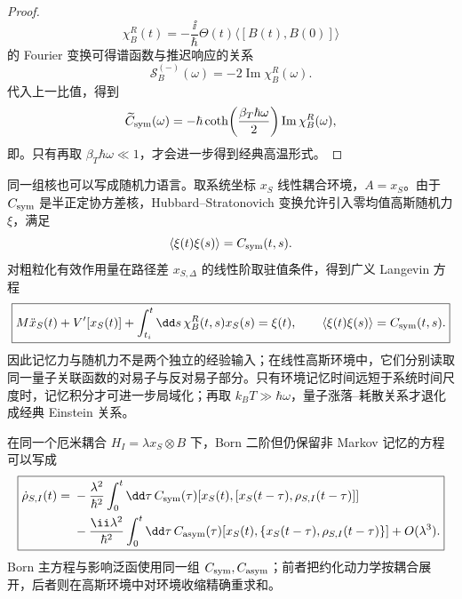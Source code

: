 \begin{proof}
\begin{equation*}
\chi_B^R(t)=-\frac{\ii}{\hbar}\Theta(t)\langle[B(t),B(0)]\rangle
\end{equation*}
的 Fourier 变换可得谱函数与推迟响应的关系
\begin{equation*}
\mathscr S_B^{(-)}(\omega)=-2\operatorname{Im}\chi_B^R(\omega).
\end{equation*}
代入上一比值，得到
\begin{equation*}
\widetilde C_{\rm sym}(\omega)
=-\hbar\coth\!\left(\frac{\beta_T\hbar\omega}{2}\right)
\operatorname{Im}\chi_B^R(\omega),
\end{equation*}
即。只有再取 $\beta_T\hbar\omega\ll1$，才会进一步得到经典高温形式。
\end{proof}


同一组核也可以写成随机力语言。取系统坐标 $x_S$ 线性耦合环境，$A=x_S$。由于 $C_{\rm sym}$ 是半正定协方差核，Hubbard--Stratonovich 变换允许引入零均值高斯随机力 $\xi$，满足
\[
\langle\xi(t)\xi(s)\rangle=C_{\rm sym}(t,s).
\]
对粗粒化有效作用量在路径差 $x_{S,\Delta}$ 的线性阶取驻值条件，得到广义 Langevin 方程
\begin{equation}
\boxed{
M\ddot x_S(t)+V'[x_S(t)]
+\int_{t_i}^{t}\dd s\,\chi_B^R(t,s)x_S(s)
=\xi(t),
\qquad
\langle\xi(t)\xi(s)\rangle=C_{\rm sym}(t,s).}
\label{eq:generalized_langevin_from_influence}
\end{equation}
因此记忆力与随机力不是两个独立的经验输入；在线性高斯环境中，它们分别读取同一量子关联函数的对易子与反对易子部分。只有环境记忆时间远短于系统时间尺度时，记忆积分才可进一步局域化；再取 $k_BT\gg\hbar\omega$，量子涨落--耗散关系才退化成经典 Einstein 关系。

在同一个厄米耦合 $H_I=\lambda x_S\otimes B$ 下，Born 二阶但仍保留非 Markov 记忆的方程可以写成
\begin{equation}
\boxed{
\begin{aligned}
\dot\rho_{S,I}(t)
={}&-\frac{\lambda^2}{\hbar^2}\int_0^t\dd\tau\,
C_{\rm sym}(\tau)[x_S(t),[x_S(t-\tau),\rho_{S,I}(t-\tau)]]\\
&-\frac{\ii\lambda^2}{\hbar^2}\int_0^t\dd\tau\,
C_{\rm asym}(\tau)[x_S(t),\{x_S(t-\tau),\rho_{S,I}(t-\tau)\}]
+O(\lambda^3).
\end{aligned}}
\label{eq:born_nonmarkov_noise_dissipation_form}
\end{equation}
Born 主方程与影响泛函使用同一组 $C_{\rm sym},C_{\rm asym}$；前者把约化动力学按耦合展开，后者则在高斯环境中对环境收缩精确重求和。

